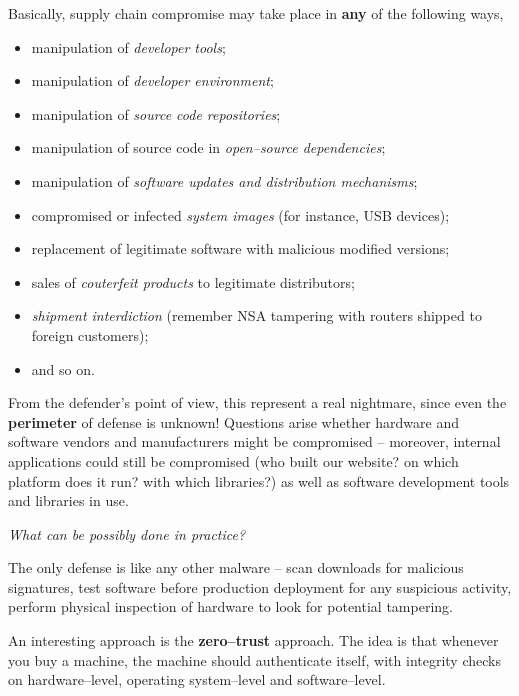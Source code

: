 \documentclass[10pt]{extbook}
\begin{document}
Basically, supply chain compromise may take place in \textbf{any} of the
following ways,
\begin{itemize}
    \item manipulation of \emph{developer tools};
    \item manipulation of \emph{developer environment};
    \item manipulation of \emph{source code repositories};
    \item manipulation of source code in \emph{open--source dependencies};
    \item manipulation of \emph{software updates and distribution mechanisms};
    \item compromised or infected \emph{system images} (for instance, USB
        devices);
    \item replacement of legitimate software with malicious modified versions;
    \item sales of \emph{couterfeit products} to legitimate distributors;
    \item \emph{shipment interdiction} (remember NSA tampering with routers
        shipped to foreign customers);
    \item and so on.
\end{itemize}

From the defender's point of view, this represent a real nightmare, since even
the \textbf{perimeter} of defense is unknown! Questions arise whether hardware
and software vendors and manufacturers might be compromised -- moreover,
internal applications could still be compromised (who built our
website? on which platform does it run? with which libraries?) as well as
software development tools and libraries in use.

\vspace*{1cm}

\begin{center}
\emph{What can be possibly done in practice?}
\end{center}

\vspace*{1cm}

The only defense is like any other malware -- scan downloads for malicious
signatures, test software before production deployment for any suspicious
activity, perform physical inspection of hardware to look for potential
tampering.

An interesting approach is the \textbf{zero--trust} approach. The idea is that
whenever you buy a machine, the machine should authenticate itself, with
integrity checks on hardware--level, operating system--level and
software--level.
\end{document}
